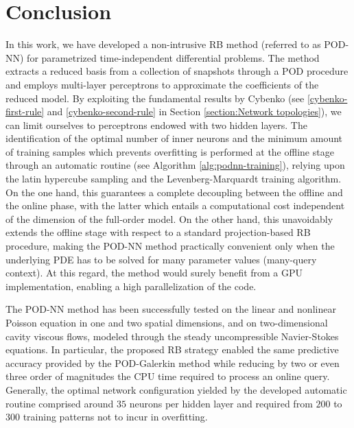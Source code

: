\documentclass[12pt, a4paper, twoside, openright, notitlepage]{report}
\numberwithin{equation}{chapter}
\theoremstyle{theorem}
\theoremstyle{definition}
\theoremstyle{remark}
\theoremstyle{proposition}
\numberwithin{figure}{chapter}
\begin{document}
		
	\chapter*{Conclusion}
	
		In this work, we have developed a non-intrusive RB method (referred to as POD-NN) for parametrized time-independent differential problems. The method extracts a reduced basis from a collection of snapshots through a POD procedure and employs multi-layer perceptrons to approximate the coefficients of the reduced model. By exploiting the fundamental results by Cybenko (see \ref{cybenko-first-rule} and \ref{cybenko-second-rule} in Section \ref{section:Network topologies}), we can limit ourselves to perceptrons endowed with two hidden layers. The identification of the optimal number of inner neurons and the minimum amount of training samples which prevents overfitting is performed at the offline stage through an automatic routine (see Algorithm \ref{alg:podnn-training}), relying upon the latin hypercube sampling and the Levenberg-Marquardt training algorithm. On the one hand, this guarantees a complete decoupling between the offline and the online phase, with the latter which entails a computational cost independent of the dimension of the full-order model. On the other hand, this unavoidably extends the offline stage with respect to a standard projection-based RB procedure, making the POD-NN method practically convenient only when the underlying PDE has to be solved for many parameter values (many-query context). At this regard, the method would surely benefit from a GPU implementation, enabling a high parallelization of the code.
		
		The POD-NN method has been successfully tested on the linear and nonlinear Poisson equation in one and two spatial dimensions, and on two-dimensional cavity viscous flows, modeled through the steady uncompressible Navier-Stokes equations. In particular, the proposed RB strategy enabled the same predictive accuracy provided by the POD-Galerkin method while reducing by two or even three order of magnitudes the CPU time required to process an online query. Generally, the optimal network configuration yielded by the developed automatic routine comprised around $35$ neurons per hidden layer and required from $200$ to $300$ training patterns not to incur in overfitting.
		
\end{document}
